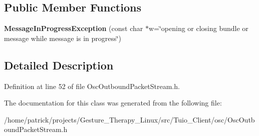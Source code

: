 \subsection*{Public Member Functions}
\begin{DoxyCompactItemize}
\item 
\mbox{\label{classosc_1_1_message_in_progress_exception_addfd0725a611db70b3205014fde844a1}} 
{\bfseries Message\+In\+Progress\+Exception} (const char $\ast$w=\char`\"{}opening or closing bundle or message while message is in progress\char`\"{})
\end{DoxyCompactItemize}


\subsection{Detailed Description}


Definition at line 52 of file Osc\+Outbound\+Packet\+Stream.\+h.



The documentation for this class was generated from the following file\+:\begin{DoxyCompactItemize}
\item 
/home/patrick/projects/\+Gesture\+\_\+\+Therapy\+\_\+\+Linux/src/\+Tuio\+\_\+\+Client/osc/Osc\+Outbound\+Packet\+Stream.\+h\end{DoxyCompactItemize}
